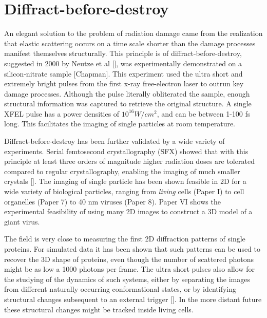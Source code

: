 \section{Diffract-before-destroy}
An elegant solution to the problem of radiation damage came from the realization that elastic scattering occurs on a  time scale shorter than the damage processes manifest themselves structurally. This principle is of diffract-before-destroy, suggested in 2000 by Neutze et al [], was experimentally demonstrated on a silicon-nitrate sample [Chapman]. This experiment used the ultra short and extremely bright pulses from the first x-ray free-electron laser to outrun key damage processes. Although the pulse literally obliterated the sample, enough structural information was captured to retrieve the original structure. A single XFEL pulse has a power densities of $10^16 W/cm^2$, and can be between 1-100 fs long. This facilitates the imaging of single particles at room temperature.

Diffract-before-destroy has been further validated by a wide variety of experiments. Serial femtosecond crystallography (SFX) showed that with this principle at least three orders of magnitude higher radiation doses are tolerated compared to regular crystallography, enabling the imaging of much smaller crystals []. The imaging of single particle has been shown feasible in 2D for a wide variety of biological particles, ranging from \textit{living} cells (Paper I) to cell organelles (Paper 7) to  40 nm viruses (Paper 8). Paper VI shows the experimental feasibility of using many 2D images to construct a 3D model of a giant virus.

The field is very close to measuring the first 2D diffraction patterns of single proteins. For simulated data it has been shown that such patterns can be used to recover the 3D shape of proteins, even though the number of scattered photons might be as low a 1000 photons per frame. The ultra short pulses also allow for the studying of the dynamics of such systems, either by separating the images from different naturally occurring conformational states, or by identifying structural changes subsequent to an external trigger []. In the more distant future these structural changes might be tracked inside living cells. 
 